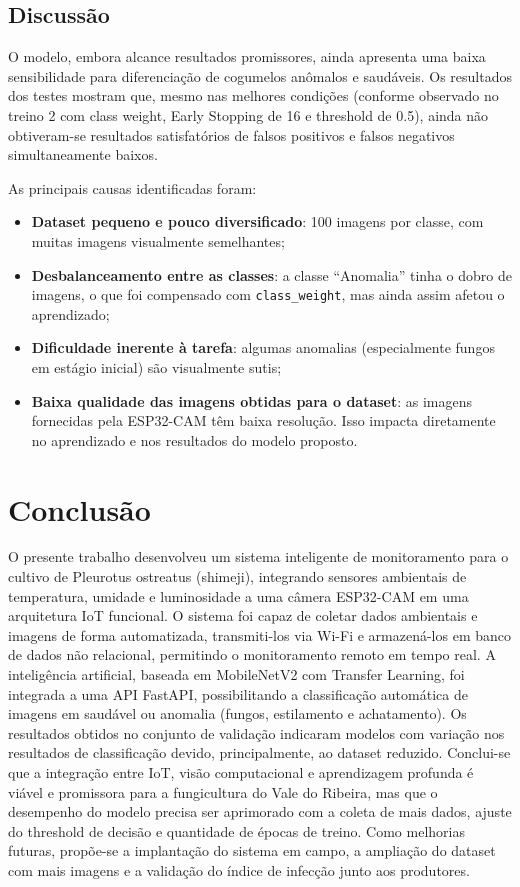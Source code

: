\documentclass[11pt,a4paper]{article}
\begin{document}
\subsection{Discussão}

O modelo, embora alcance resultados promissores, ainda apresenta uma baixa sensibilidade para diferenciação de cogumelos anômalos e saudáveis. Os resultados dos testes mostram que, mesmo nas melhores condições (conforme observado no treino 2 com class weight, Early Stopping de 16 e threshold de 0.5), ainda não obtiveram-se resultados satisfatórios de falsos positivos e falsos negativos simultaneamente baixos.

As principais causas identificadas foram:

\begin{itemize}
    \item \textbf{Dataset pequeno e pouco diversificado}: 100 imagens por classe, com muitas imagens visualmente semelhantes;
    \item \textbf{Desbalanceamento entre as classes}: a classe ``Anomalia'' tinha o dobro de imagens, o que foi compensado com \texttt{class\_weight}, mas ainda assim afetou o aprendizado;
    \item \textbf{Dificuldade inerente à tarefa}: algumas anomalias (especialmente fungos em estágio inicial) são visualmente sutis;
    \item \textbf{Baixa qualidade das imagens obtidas para o dataset}: as imagens fornecidas pela ESP32-CAM têm baixa resolução. Isso impacta diretamente no aprendizado e nos resultados do modelo proposto.
\end{itemize}

\section{Conclusão}

O presente trabalho desenvolveu um sistema inteligente de monitoramento para o cultivo de Pleurotus ostreatus (shimeji), integrando sensores ambientais de temperatura, umidade e luminosidade a uma câmera ESP32-CAM em uma arquitetura IoT funcional. O sistema foi capaz de coletar dados ambientais e imagens de forma automatizada, transmiti-los via Wi-Fi e armazená-los em banco de dados não relacional, permitindo o monitoramento remoto em tempo real. A inteligência artificial, baseada em MobileNetV2 com Transfer Learning, foi integrada a uma API FastAPI, possibilitando a classificação automática de imagens em saudável ou anomalia (fungos, estilamento e achatamento). Os resultados obtidos no conjunto de validação indicaram modelos com variação nos resultados de classificação devido, principalmente, ao dataset reduzido. Conclui-se que a integração entre IoT, visão computacional e aprendizagem profunda é viável e promissora para a fungicultura do Vale do Ribeira, mas que o desempenho do modelo precisa ser aprimorado com a coleta de mais dados, ajuste do threshold de decisão e quantidade de épocas de treino. Como melhorias futuras, propõe-se a implantação do sistema em campo, a ampliação do dataset com mais imagens e a validação do índice de infecção junto aos produtores.
\end{document}
